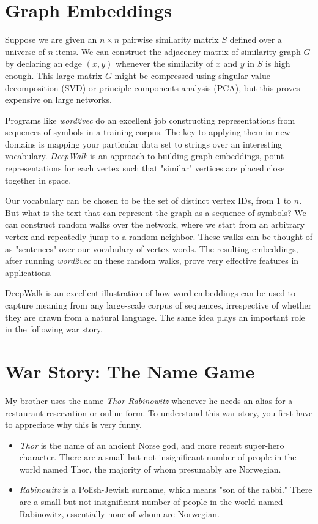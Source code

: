\documentclass[10pt]{article}
\begin{document}
\begin{enumerate}
\section{Graph Embeddings}
Suppose we are given an $n \times n$ pairwise similarity matrix $S$ defined over a universe of $n$ items. We can construct the adjacency matrix of similarity graph $G$ by declaring an edge $(x, y)$ whenever the similarity of $x$ and $y$ in $S$ is high enough. This large matrix $G$ might be compressed using singular value decomposition (SVD) or principle components analysis (PCA), but this proves expensive on large networks.

Programs like \textit{word2vec} do an excellent job constructing representations from sequences of symbols in a training corpus. The key to applying them in new domains is mapping your particular data set to strings over an interesting vocabulary. \textit{DeepWalk} is an approach to building graph embeddings, point representations for each vertex such that "similar" vertices are placed close together in space.

Our vocabulary can be chosen to be the set of distinct vertex IDs, from 1 to $n$. But what is the text that can represent the graph as a sequence of symbols? We can construct random walks over the network, where we start from an arbitrary vertex and repeatedly jump to a random neighbor. These walks can be thought of as "sentences" over our vocabulary of vertex-words. The resulting embeddings, after running \textit{word2vec} on these random walks, prove very effective features in applications.

DeepWalk is an excellent illustration of how word embeddings can be used to capture meaning from any large-scale corpus of sequences, irrespective of whether they are drawn from a natural language. The same idea plays an important role in the following war story.

\section{War Story: The Name Game}
My brother uses the name \textit{Thor Rabinowitz} whenever he needs an alias for a restaurant reservation or online form. To understand this war story, you first have to appreciate why this is very funny.

\begin{itemize}
  \item \textit{Thor} is the name of an ancient Norse god, and more recent super-hero character. There are a small but not insignificant number of people in the world named Thor, the majority of whom presumably are Norwegian.
  \item \textit{Rabinowitz} is a Polish-Jewish surname, which means "son of the rabbi." There are a small but not insignificant number of people in the world named Rabinowitz, essentially none of whom are Norwegian.
\end{itemize}


\end{enumerate}
\end{document}
